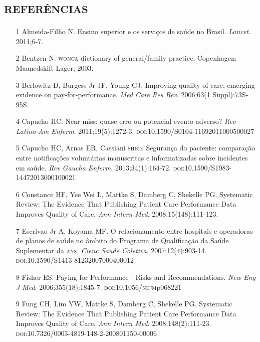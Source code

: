 \documentclass{article}
\begin{document}
\section*{\textsc{referências}}
\begin{itemize}

\item[1] Almeida-Filho N. Ensino superior e os serviços de saúde no Brasil.
\textit{Lancet}. 2011;6-7.

\item[2] Bentzen N. \textsc{wonca} dictionary of general/family practice. Copenhagen:
Maanedskift Lager; 2003.

\item[3] Berlowitz D, Burgess Jr JF, Young GJ. Improving quality of care:
emerging
evidence on pay-for-performance. \textit{Med Care Res Rev}. 2006;63(1
Suppl):73S-95S.

\item[4] Capucho HC. Near miss: quase erro ou potencial evento adverso?
\textit{Rev
Latino-Am Enferm}. 2011;19(5):1272-3.
\textsc{doi}:10.1590/S0104-11692011000500027

\item[5] Capucho HC, Arnas ER, Cassiani \textsc{shbd}. Segurança do paciente:
comparação
entre notificações voluntárias manuscritas e informatizadas sobre incidentes em
saúde.
\textit{Rev Gaucha Enferm}. 2013;34(1):164-72.
\textsc{doi}:10.1590/S1983-14472013000100021

\item[6] Constance HF, Yee Wei L, Mattke S, Damberg C, Shekelle PG. Systematic
Review: The Evidence That Publishing Patient Care Performance Data Improves
Quality of
Care. \textit{Ann Intern Med}. 2008;15(148):111-123.

\item[7] Escrivao Jr A, Koyama MF. O relacionamento entre hospitais e
operadoras de
planos de saúde no âmbito do Programa de Qualificação da Saúde Suplementar da
\textsc{ans}.
\textit{Cienc Saude Coletiva}. 2007;12(4):903-14.
\textsc{doi}:10.1590/S1413-81232007000400012

\item[8] Fisher ES. Paying for Performance - Risks and Recommendations.
\textit{New
Eng J Med}. 2006;355(18):1845-7. \textsc{doi}:10.1056/\textsc{nejm}p068221

\item[9] Fung CH, Lim YW, Mattke S, Damberg C, Shekelle PG. Systematic Review:
The
Evidence That Publishing Patient Care Performance Data Improves Quality of Care.
\textit{Ann Intern Med}. 2008;148(2):111-23.
\textsc{doi}:10.7326/0003-4819-148-2-200801150-00006


\end{itemize}
\end{document}
